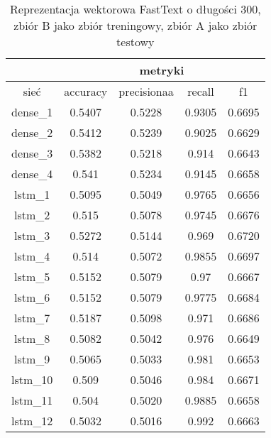 \begin{table}[] \centering
    \caption{Reprezentacja wektorowa FastText o długości 300, zbiór B jako zbiór treningowy, zbiór A jako zbiór testowy }
    \label{tab:wyniki_300_eks2}
    \begin{tabular}{|c|c|c|c|c|}
        \hline
                 & \multicolumn{4}{c|}{metryki}                                 \\ \hline
        sieć     & accuracy                     & precisionaa & recall & f1     \\ \hline
        dense\_1 & 0.5407                       & 0.5228      & 0.9305 & 0.6695 \\ \hline
        dense\_2 & 0.5412                       & 0.5239      & 0.9025 & 0.6629 \\ \hline
        dense\_3 & 0.5382                       & 0.5218      & 0.914  & 0.6643 \\ \hline
        dense\_4 & 0.541                        & 0.5234      & 0.9145 & 0.6658 \\ \hline
        lstm\_1  & 0.5095                       & 0.5049      & 0.9765 & 0.6656 \\ \hline
        lstm\_2  & 0.515                        & 0.5078      & 0.9745 & 0.6676 \\ \hline
        lstm\_3  & 0.5272                       & 0.5144      & 0.969  & 0.6720 \\ \hline
        lstm\_4  & 0.514                        & 0.5072      & 0.9855 & 0.6697 \\ \hline
        lstm\_5  & 0.5152                       & 0.5079      & 0.97   & 0.6667 \\ \hline
        lstm\_6  & 0.5152                       & 0.5079      & 0.9775 & 0.6684 \\ \hline
        lstm\_7  & 0.5187                       & 0.5098      & 0.971  & 0.6686 \\ \hline
        lstm\_8  & 0.5082                       & 0.5042      & 0.976  & 0.6649 \\ \hline
        lstm\_9  & 0.5065                       & 0.5033      & 0.981  & 0.6653 \\ \hline
        lstm\_10 & 0.509                        & 0.5046      & 0.984  & 0.6671 \\ \hline
        lstm\_11 & 0.504                        & 0.5020      & 0.9885 & 0.6658 \\ \hline
        lstm\_12 & 0.5032                       & 0.5016      & 0.992  & 0.6663 \\ \hline

\end{tabular}
\end{table}
